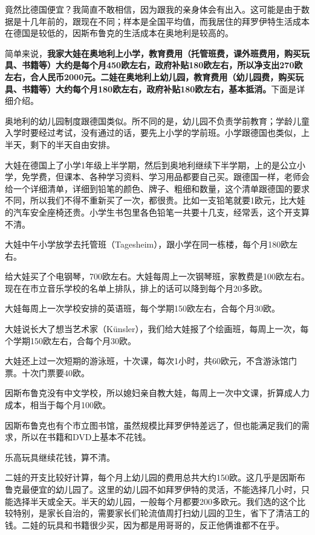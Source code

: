 \documentclass[twoside,openright,headings=optiontohead]{ctexbook} %
\begin{document}
{竟然比德国便宜？我简直不敢相信，因为跟我的亲身体会有出入。这可能是由于数据是十几年前的，跟现在不同；样本是全国平均值，而我居住的拜罗伊特生活成本在德国是较低的，因斯布鲁克的生活成本在奥地利是较高的。

简单来说，\textbf{我家大娃在奥地利上小学，教育费用（托管班费，课外班费用，购买玩具、书籍等）大约是每个月450欧左右，政府补贴180欧左右，所以净支出270欧左右，合人民币2000元。二娃在奥地利上幼儿园，教育费用（幼儿园费，购买玩具、书籍等）大约每个月180欧左右，政府补贴180欧左右，基本抵消。}下面是详细介绍。

奥地利的幼儿园制度跟德国类似。所不同的是，幼儿园不负责学前教育；学龄儿童入学时要经过考试，没有通过的话，要先上小学的学前班。小学跟德国也类似，上半天，剩下的半天自由安排。

大娃在德国上了小学1年级上半学期，然后到奥地利继续下半学期，上的是公立小学，免学费，但课本、各种学习资料、学习用品都要自己买。跟德国一样，老师会给一个详细清单，详细到铅笔的颜色、牌子、粗细和数量，这个清单跟德国的要求不同，所以我们不得不重新买了一次，都很贵。比如一支铅笔就要1欧元，比大娃的汽车安全座椅还贵。小学生书包里各色铅笔一共要十几支，经常丢，这个开支算不清。

大娃中午小学放学去托管班（Tagesheim），跟小学在同一栋楼，每个月180欧左右。

给大娃买了个电钢琴，700欧左右。大娃每周上一次钢琴班，家教费是100欧左右。现在在市立音乐学校的名单上排队，排上的话可以降到每个月20多欧。

大娃每周上一次学校安排的英语班，每个学期150欧左右，合每个月30欧。

大娃说长大了想当艺术家（Künsler），我们给大娃报了个绘画班，每周上一次，每个学期150欧左右，合每个月30欧。

大娃还上过一次短期的游泳班，十次课，每次1小时，共60欧元，不含游泳馆门票。十次门票要40欧。

因斯布鲁克没有中文学校，所以媳妇亲自教大娃，每周上一次中文课，折算成人力成本，相当于每个月100欧。

因斯布鲁克也有个市立图书馆，虽然规模比拜罗伊特差远了，但也能满足我们的需求，所以在书籍和DVD上基本不花钱。

乐高玩具继续花钱，算不清。

二娃的开支比较好计算，每个月上幼儿园的费用总共大约150欧。这几乎是因斯布鲁克最便宜的幼儿园了。这里的幼儿园不如拜罗伊特的灵活，不能选择几小时，只能选择半天或全天。半天的幼儿园，一般每个月都要200多欧元。我们选的这个比较特别，是家长自治的，需要家长们轮流值周打扫幼儿园的卫生，省下了清洁工的钱。二娃的玩具和书籍很少买，因为都是用哥哥的，反正他俩谁都不在乎。

}
\end{document}
